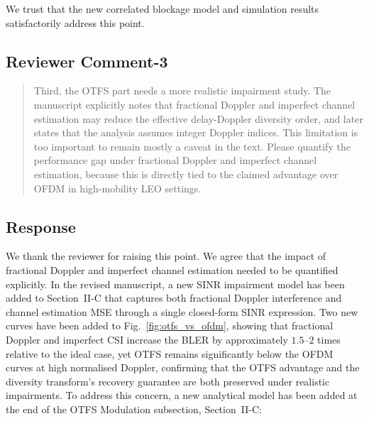 We trust that the new correlated blockage model and simulation results satisfactorily address this point.


\subsection{Reviewer Comment-3}



\begin{mdframed}
\begin{quote}
Third, the OTFS part needs a more realistic impairment study. The manuscript explicitly notes that fractional Doppler and imperfect channel estimation may reduce the effective delay-Doppler diversity order, and later states that the analysis assumes integer Doppler indices. This limitation is too important to remain mostly a caveat in the text. Please quantify the performance gap under fractional Doppler and imperfect channel estimation, because this is directly tied to the claimed advantage over OFDM in high-mobility LEO settings.

\end{quote}

\end{mdframed}


\subsection{Response}

We thank the reviewer for raising this point. We agree that the impact of fractional Doppler and imperfect channel estimation needed to be quantified explicitly. In the revised manuscript, a new SINR impairment model has been added to Section~II-C that captures both fractional Doppler interference and channel estimation MSE through a single closed-form SINR expression. Two new curves have been added to Fig.~\ref{fig:otfs_vs_ofdm}, showing that fractional Doppler and imperfect CSI increase the BLER by approximately $1.5$--$2$ times relative to the ideal case, yet OTFS remains significantly below the OFDM curves at high normalised Doppler, confirming that the OTFS advantage and the diversity transform's recovery guarantee are both preserved under realistic impairments. To address this concern, a new analytical model has been added at the end of the OTFS Modulation subsection, Section~II-C:

